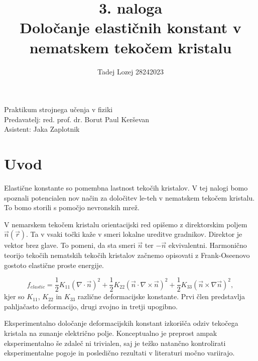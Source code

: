\documentclass[slovene,11pt,a4paper]{article}
\begin{document}
\title{3. naloga \\ Določanje elastičnih konstant v nematskem tekočem kristalu}
\author{Tadej Lozej 28242023}
\maketitle

\begin{center}
Praktikum strojnega učenja v fiziki \\
\bigskip
Predavatelj: red. prof. dr. Borut Paul Kerševan \\
Asistent: Jaka Zaplotnik
\end{center}

\newpage

\tableofcontents

\newpage


\section{Uvod}

Elastične konstante so pomembna lastnost tekočih kristalov. V tej nalogi bomo spoznali potencialen nov način za določitev le-teh v nematskem tekočem kristalu. To bomo storili s pomočjo nevronskih mrež.

V nemarskem tekočem kristalu orientacijski red opišemo z direktorskim poljem $\vec{n}(\vec{r})$. Ta v vsaki točki kaže v smeri lokalne ureditve gradnikov. Direktor je vektor brez glave. To pomeni, da sta smeri $\vec{n}$ ter $-\vec{n}$ ekvivalentni. Harmonično teorijo tekočih nematskih tekočih kristalov začnemo opisovati z Frank-Oseenovo gostoto elastične proste energije.

\begin{equation}
    f_{elastic} =
    \frac{1}{2} K_{11} (\nabla \cdot \vec{n})^2 + 
    \frac{1}{2} K_{22} (\vec{n} \cdot \nabla \times \vec{n})^2 +
    \frac{1}{2} K_{33} (\vec{n} \times \nabla \vec{n})^2,
\end{equation}
kjer so $K_{11}$, $K_{22}$ in $K_{33}$ različne deformacijske konstante. Prvi člen predstavlja pahljačasto deformacijo, drugi zvojno in tretji upogibno.

Eksperimentalno določanje deformacijskih konstant izkorišča odziv tekočega kristala na zunanje električno polje. Konceptualno je preprost ampak eksperimentalno še zdaleč ni trivialen, saj je težko natančno kontrolirati eksperimentalne pogoje in posledično rezultati v literaturi močno variirajo.
\end{document}
